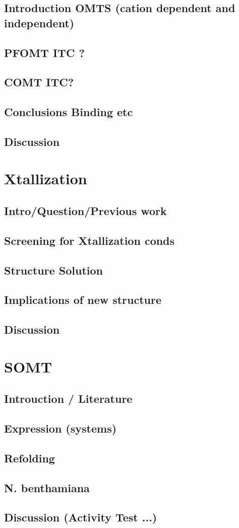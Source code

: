 \documentclass[10pt]{book}\usepackage[]{graphicx}\usepackage[]{color}
\begin{document}
\section{Introduction OMTS (cation dependent and independent)}
\section{PFOMT ITC ?}
\section{COMT ITC?}
\section{Conclusions Binding etc}
\section{Discussion}

\chapter{Xtallization}
\section{Intro/Question/Previous work}
\section{Screening for Xtallization conds}
\section{Structure Solution}
\section{Implications of new structure}
\section{Discussion}


\chapter{SOMT}
\section{Introuction / Literature}
\section{Expression (systems)}
\section{Refolding}
\section{N. benthamiana}
\section{Discussion (Activity Test ...)}
\end{document}
